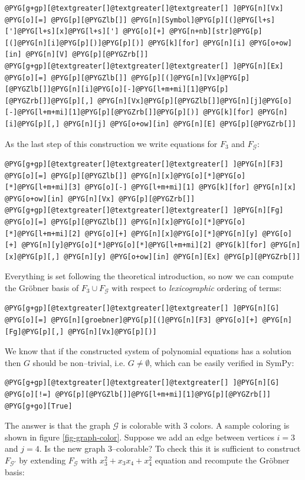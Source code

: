 \begin{Verbatim}[commandchars=@\[\]]
@PYG[g+gp][@textgreater[]@textgreater[]@textgreater[] ]@PYG[n][Vx] @PYG[o][=] @PYG[p][@PYGZlb[]] @PYG[n][Symbol]@PYG[p][(]@PYG[l+s][']@PYG[l+s][x]@PYG[l+s]['] @PYG[o][+] @PYG[n+nb][str]@PYG[p][(]@PYG[n][i]@PYG[p][)]@PYG[p][)] @PYG[k][for] @PYG[n][i] @PYG[o+ow][in] @PYG[n][V] @PYG[p][@PYGZrb[]]
@PYG[g+gp][@textgreater[]@textgreater[]@textgreater[] ]@PYG[n][Ex] @PYG[o][=] @PYG[p][@PYGZlb[]] @PYG[p][(]@PYG[n][Vx]@PYG[p][@PYGZlb[]]@PYG[n][i]@PYG[o][-]@PYG[l+m+mi][1]@PYG[p][@PYGZrb[]]@PYG[p][,] @PYG[n][Vx]@PYG[p][@PYGZlb[]]@PYG[n][j]@PYG[o][-]@PYG[l+m+mi][1]@PYG[p][@PYGZrb[]]@PYG[p][)] @PYG[k][for] @PYG[n][i]@PYG[p][,] @PYG[n][j] @PYG[o+ow][in] @PYG[n][E] @PYG[p][@PYGZrb[]]
\end{Verbatim}
\noindent
As the last step of this construction we write equations for $F_3$ and $F_{\mathcal{G}}$:

\begin{Verbatim}[commandchars=@\[\]]
@PYG[g+gp][@textgreater[]@textgreater[]@textgreater[] ]@PYG[n][F3] @PYG[o][=] @PYG[p][@PYGZlb[]] @PYG[n][x]@PYG[o][*]@PYG[o][*]@PYG[l+m+mi][3] @PYG[o][-] @PYG[l+m+mi][1] @PYG[k][for] @PYG[n][x] @PYG[o+ow][in] @PYG[n][Vx] @PYG[p][@PYGZrb[]]
@PYG[g+gp][@textgreater[]@textgreater[]@textgreater[] ]@PYG[n][Fg] @PYG[o][=] @PYG[p][@PYGZlb[]] @PYG[n][x]@PYG[o][*]@PYG[o][*]@PYG[l+m+mi][2] @PYG[o][+] @PYG[n][x]@PYG[o][*]@PYG[n][y] @PYG[o][+] @PYG[n][y]@PYG[o][*]@PYG[o][*]@PYG[l+m+mi][2] @PYG[k][for] @PYG[n][x]@PYG[p][,] @PYG[n][y] @PYG[o+ow][in] @PYG[n][Ex] @PYG[p][@PYGZrb[]]
\end{Verbatim}
\noindent
Everything is set following the theoretical introduction, so now we can compute the Gröbner
basis of $F_3 \cup F_{\mathcal{G}}$ with respect to \emph{lexicographic} ordering of terms:

\begin{Verbatim}[commandchars=@\[\]]
@PYG[g+gp][@textgreater[]@textgreater[]@textgreater[] ]@PYG[n][G] @PYG[o][=] @PYG[n][groebner]@PYG[p][(]@PYG[n][F3] @PYG[o][+] @PYG[n][Fg]@PYG[p][,] @PYG[n][Vx]@PYG[p][)]
\end{Verbatim}
\noindent
We know that if the constructed system of polynomial equations has a solution then $G$ should be
non--trivial, i.e. $G \not= \emptyset$, which can be easily verified in SymPy:

\begin{Verbatim}[commandchars=@\[\]]
@PYG[g+gp][@textgreater[]@textgreater[]@textgreater[] ]@PYG[n][G] @PYG[o][!=] @PYG[p][@PYGZlb[]]@PYG[l+m+mi][1]@PYG[p][@PYGZrb[]]
@PYG[g+go][True]
\end{Verbatim}
\noindent
The answer is that the graph $\mathcal{G}$ is colorable with $3$ colors. A sample coloring is shown
in figure \ref{fig-graph-color}. Suppose we add an edge between vertices $i = 3$ and $j = 4$. Is
the new graph $3$--colorable? To check this it is sufficient to construct $F_{\mathcal{G'}}$ by
extending $F_{\mathcal{G}}$ with $x_3^2 + x_3 x_4 + x_4^2$ equation and recompute the Gröbner
basis:

